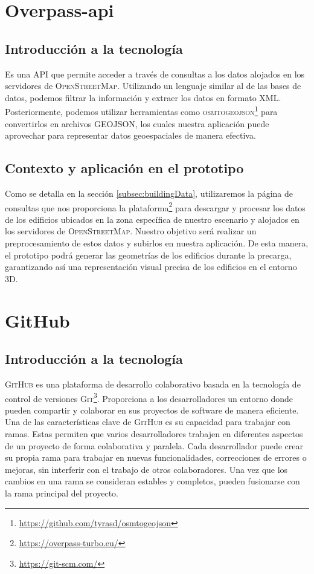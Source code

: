 \documentclass[a4paper, 11pt]{book}
\begin{document}
\section{Overpass-api}
\subsection{Introducción a la tecnología}
Es una \textsc{API} que permite acceder a través de consultas a los datos alojados en los servidores de \textsc{OpenStreetMap}. Utilizando un lenguaje similar al de las bases de datos, podemos filtrar la información y extraer los datos en formato \textsc{XML}. Posteriormente, podemos utilizar herramientas como \textsc{osmtogeojson}\footnote{\url{https://github.com/tyrasd/osmtogeojson}} para convertirlos en archivos \textsc{GEOJSON}, los cuales nuestra aplicación puede aprovechar para representar datos geoespaciales de manera efectiva.
\subsection{Contexto y aplicación en el prototipo}
Como se detalla en la sección \ref{subsec:buildingData}, utilizaremos la página de consultas que nos proporciona la plataforma\footnote{\url{https://overpass-turbo.eu/}} para descargar y procesar los datos de los edificios ubicados en la zona específica de nuestro escenario y alojados en los servidores de \textsc{OpenStreetMap}. Nuestro objetivo será realizar un preprocesamiento de estos datos y subirlos en nuestra aplicación. De esta manera, el prototipo podrá generar las geometrías de los edificios durante la precarga, garantizando así una representación visual precisa de los edificios en el entorno \textsc{3D}.
\section{GitHub}
\label{sec:github}
\subsection{Introducción a la tecnología}
\textsc{GitHub} es una plataforma de desarrollo colaborativo basada en la tecnología de control de versiones \textsc{Git}\footnote{\url{https://git-scm.com/}}. Proporciona a los desarrolladores un entorno donde pueden compartir y colaborar en sus proyectos de software de manera eficiente.
Una de las características clave de \textsc{GitHub} es su capacidad para trabajar con ramas. Estas permiten que varios desarrolladores trabajen en diferentes aspectos de un proyecto de forma colaborativa y paralela. Cada desarrollador puede crear su propia rama para trabajar en nuevas funcionalidades, correcciones de errores o mejoras, sin interferir con el trabajo de otros colaboradores. Una vez que los cambios en una rama se consideran estables y completos, pueden fusionarse con la rama principal del proyecto.
\end{document}
